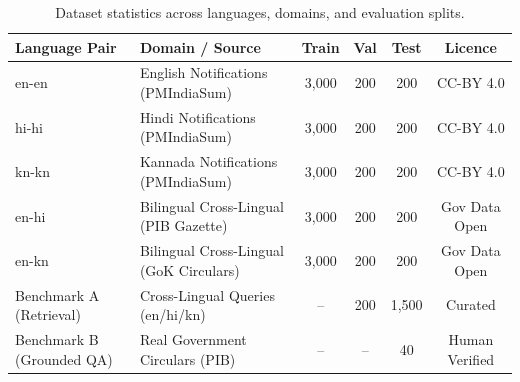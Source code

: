 \begin{table}[t]
\centering
\caption{Dataset statistics across languages, domains, and evaluation splits.}
\label{tab:datasets}
\begin{tabular}{llcccc}
\toprule
\textbf{Language Pair} & \textbf{Domain / Source} & \textbf{Train} & \textbf{Val} & \textbf{Test} & \textbf{Licence} \\
\midrule
en-en & English Notifications (PMIndiaSum) & 3,000 & 200 & 200 & CC-BY 4.0 \\
hi-hi & Hindi Notifications (PMIndiaSum) & 3,000 & 200 & 200 & CC-BY 4.0 \\
kn-kn & Kannada Notifications (PMIndiaSum) & 3,000 & 200 & 200 & CC-BY 4.0 \\
en-hi & Bilingual Cross-Lingual (PIB Gazette) & 3,000 & 200 & 200 & Gov Data Open \\
en-kn & Bilingual Cross-Lingual (GoK Circulars) & 3,000 & 200 & 200 & Gov Data Open \\
\midrule
Benchmark A (Retrieval) & Cross-Lingual Queries (en/hi/kn) & -- & 200 & 1,500 & Curated \\
Benchmark B (Grounded QA) & Real Government Circulars (PIB) & -- & -- & 40 & Human Verified \\
\bottomrule
\end{tabular}
\end{table}